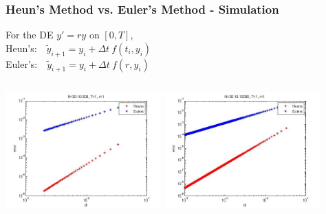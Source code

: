\begin{frame}
   \frametitle{Heun's Method vs. Euler's Method - Simulation}
For the DE $y'=r y$ on $[0,T]$,\\
\vspace{1em}
	\hspace{1.5em} Heun's:$\hspace{1em} \tilde{y}_{i+1} = y_i + \Delta t \ f(t_i, y_i)$ \\
	\hspace{1.5em} Euler's:$\hspace{1em}\tilde{y}_{i+1} = y_i + \Delta t \ f(r, y_i)$ \\
\begin{columns}[t]
    \includegraphics[width=6cm]{img/Heun500}
    \includegraphics[width=6cm]{img/Heun10000}
  \end{columns}

\end{frame}
